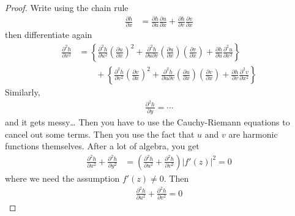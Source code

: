 \begin{proof}
    Write using the chain rule
    \begin{align}
        \frac{\partial h}{\partial x} &=
        \frac{\partial h}{\partial u} \frac{\partial u}{\partial x}
        + \frac{\partial h}{\partial v} \frac{\partial v}{\partial x}
    \end{align}
    then differentiate again
    \begin{align}
        \frac{\partial^2 h}{\partial x^2} &=
        \left\{
            \frac{\partial^2 h}{\partial u^2}
            \left(\frac{\partial u}{\partial x} \right)^2
            +
            \frac{\partial^2 h}{\partial u \partial v}
            \left( \frac{\partial u}{\partial x} \right)
            \left( \frac{\partial v}{\partial x} \right)
            + \frac{\partial h}{\partial u}
            \frac{\partial^2 u}{\partial x^2}
        \right\}\\\nonumber
        &\qquad + 
        \left\{
            \frac{\partial^2 h}{\partial v^2}
            \left(\frac{\partial v}{\partial x} \right)^2
            +
            \frac{\partial^2 h}{\partial u \partial v}
            \left( \frac{\partial u}{\partial x} \right)
            \left( \frac{\partial v}{\partial x} \right)
            + \frac{\partial h}{\partial v}
            \frac{\partial^2 v}{\partial x^2}
        \right\}
    \end{align}
    Similarly,
    \begin{align}
        \frac{\partial^2 h}{\partial y} = \cdots
    \end{align}
    and it gets messy\ldots
    Then you have to use the Cauchy-Riemann equations to cancel out some terms.
    Then you use the fact that $u$ and $v$ are harmonic functions themselves.
    After a lot of algebra,
    you get
    \begin{align}
        \frac{\partial^2 h}{\partial x^2} +
        \frac{\partial^2 h}{\partial y^2} &=
        \left(
            \frac{\partial^2 h}{\partial u^2}
            + \frac{\partial^2 h}{\partial v^2}
        \right)
        |f'(z)|^2
        = 0
    \end{align}
    where we need the assumption $f'(z)\ne 0$.
    Then
    \begin{align}
        \frac{\partial^2 h}{\partial u^2}
        + \frac{\partial^2 h}{\partial v^2}
        = 0
    \end{align}
\end{proof}

